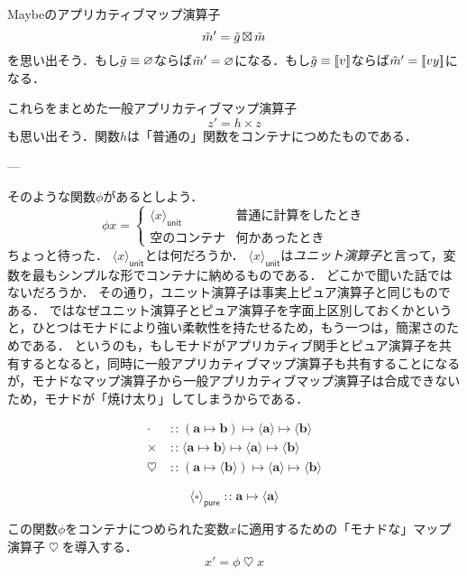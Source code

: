 \documentclass[twocolumn]{jsbook}
\def\[{\left[\!\left[}
\def\]{\right]\!\right]}
\newcommand{\keyword}[1]{{\emph{#1}}}
\newcommand{\hsklType}[1]{\textbf{#1}}
\DeclareMathOperator{\hsklApplicativeMap}{\times}
\DeclareMathOperator{\hsklApplicativeMaybeMap}{\boxtimes}
\DeclareMathOperator{\hsklFmap}{\cdot}
\DeclareMathOperator{\hsklMonadMap}{\heartsuit}
\newcommand{\hsklNothing}{\varnothing}
\newcommand{\hsklJust}[1]{\[#1\]}
\newcommand{\hsklPure}[1]{\langle#1\rangle_\textsf{pure}}
\newcommand{\hsklUnit}[1]{\langle#1\rangle_\textsf{unit}}
\newcommand{\hsklMaybe}[1]{\Tilde{#1}}
\DeclareMathOperator{\mathIn}{:\!:}
\DeclareMathOperator{\mathMapsTo}{\mapsto}
\newcommand{\mathSomething}{\square}
\newcommand{\mathMorph}[2]{#1\mathMapsTo#2}
\newcommand{\mathMorphII}[3]{#1\mathMapsTo#2\mathMapsTo#3}
\begin{document}
Maybeのアプリカティブマップ演算子$$\hsklMaybe{m}'=\hsklMaybe{g}\hsklApplicativeMaybeMap\hsklMaybe{m}$$を思い出そう．もし$\hsklMaybe{g}\equiv\hsklNothing$ならば$\hsklMaybe{m}'=\hsklNothing$になる．もし$\hsklMaybe{g}\equiv\hsklJust{v}$ならば$\hsklMaybe{m}'=\hsklJust{vy}$になる．

これらをまとめた一般アプリカティブマップ演算子$$z'=h\hsklApplicativeMap z$$も思い出そう．関数$h$は「普通の」関数をコンテナにつめたものである．


---

そのような関数$\phi$があるとしよう．
$$\phi x=\begin{cases}\hsklUnit{x}&\text{普通に計算をしたとき}\\
\text{空のコンテナ}&\text{何かあったとき}\end{cases}$$
ちょっと待った．
$\hsklUnit{x}$とは何だろうか．
$\hsklUnit{x}$は\keyword{ユニット演算子}と言って，変数を最もシンプルな形でコンテナに納めるものである．
どこかで聞いた話ではないだろうか．
その通り，ユニット演算子は事実上ピュア演算子と同じものである．
ではなぜユニット演算子とピュア演算子を字面上区別しておくかというと，ひとつはモナドにより強い柔軟性を持たせるため，もう一つは，簡潔さのためである．
というのも，もしモナドがアプリカティブ関手とピュア演算子を共有するとなると，同時に一般アプリカティブマップ演算子も共有することになるが，モナドなマップ演算子から一般アプリカティブマップ演算子は合成できないため，モナドが「焼け太り」してしまうからである．

\begin{align*}
\hsklFmap&\mathIn{}\mathMorphII{(\mathMorph{\hsklType{a}}{\hsklType{b}})}{\langle\hsklType{a}\rangle}{\langle\hsklType{b}
\rangle}\\
\hsklApplicativeMap&\mathIn{}\mathMorphII{\langle\mathMorph{\hsklType{a}}{\hsklType{b}}\rangle}{\langle\hsklType{a}\rangle}{\langle\hsklType{b}\rangle}\\
\hsklMonadMap&\mathIn{}\mathMorphII{(\mathMorph{\hsklType{a}}{\langle\hsklType{b}\rangle})}{\langle\hsklType{a}\rangle}{\langle{\hsklType{b}}\rangle}
\end{align*}

$$\hsklPure{\mathSomething}\mathIn\mathMorph{\hsklType{a}}{\langle\hsklType{a}\rangle}$$

この関数$\phi$をコンテナにつめられた変数$x$に適用するための「モナドな」マップ演算子$\hsklMonadMap$を導入する．
$$x'=\phi\hsklMonadMap x$$
\end{document}
